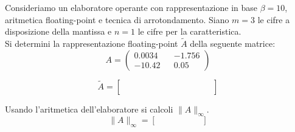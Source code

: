 Consideriamo un elaboratore operante con rappresentazione in base 
$\beta=10$, aritmetica floating-point e tecnica di 
arrotondamento. Siano $m=3$ le cifre a disposizione
della mantissa e $n=1$ le cifre per la caratteristica.\\
\noindent Si determini la rappresentazione floating-point 
$\widetilde{A}$ della seguente matrice:
\[
A=\left  (
\begin{array}{ccc}
0.0034 && -1.756 \\
-10.42 && 0.05
\end{array}
\right )
\]

\bigskip
\[
\widetilde{A}=\left [
\begin{array}{cccccccccccccc}
\quad &  \quad & \quad &  \quad & \quad & \quad \\
\quad &  \quad & \quad &  \quad & \quad & \quad \\
\quad &  \quad & \quad &  \quad & \quad & \quad \\
\quad &  \quad & \quad &  \quad  & \quad  & \quad
\end{array}\right]
\]
\bigskip

\noindent Usando l'aritmetica dell'elaboratore si calcoli 
$\|A\|_\infty$. 
\bigskip
\[
\|A\|_\infty=\left [
\begin{array}{ccc}
\quad &  \quad & \quad \\
\quad &  \quad & \quad
\end{array}\right]
\]
